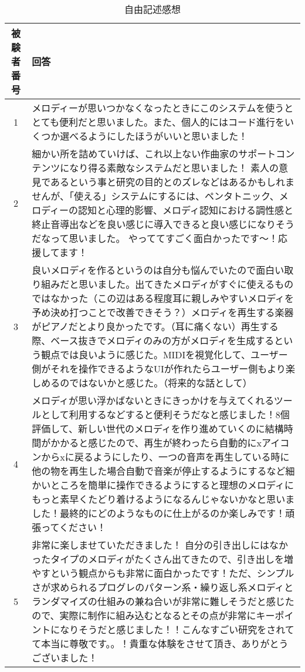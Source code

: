 \begin{table}[htbp]
  \begin{center}
    \caption{自由記述感想}
    \begin{tabular}{cp{30em}}
      \hline
      被験者番号 & 回答\rule[-3mm]{0mm}{8mm} \\ \hline \hline
      1 & メロディーが思いつかなくなったときにこのシステムを使うととても便利だと思いました。また、個人的にはコード進行をいくつか選べるようにしたほうがいいと思いました！ \\ \hline
      2 & 細かい所を詰めていけば、これ以上ない作曲家のサポートコンテンツになり得る素敵なシステムだと思いました！
      素人の意見であるという事と研究の目的とのズレなどはあるかもしれませんが、「使える」システムにするには、ペンタトニック、メロディーの認知と心理的影響、メロディ認知における調性感と終止音導出などを良い感じに導入できると良い感じになりそうだなって思いました。
      やっててすごく面白かったです～！応援してます！ \\ \hline
      3 & 良いメロディを作るというのは自分も悩んでいたので面白い取り組みだと思いました。出てきたメロディがすぐに使えるものではなかった（この辺はある程度耳に親しみやすいメロディを予め決め打つことで改善できそう？）メロディを再生する楽器がピアノだとより良かったです。（耳に痛くない）再生する際、ベース抜きでメロディのみの方がメロディを生成するという観点では良いように感じた。MIDIを視覚化して、ユーザー側がそれを操作できるようなUIが作れたらユーザー側もより楽しめるのではないかと感じた。（将来的な話として） \\ \hline
      4 & メロディが思い浮かばないときにきっかけを与えてくれるツールとして利用するなどすると便利そうだなと感じました！8個評価して、新しい世代のメロディを作り進めていくのに結構時間がかかると感じたので、再生が終わったら自動的にxアイコンからxに戻るようにしたり、一つの音声を再生している時に他の物を再生した場合自動で音楽が停止するようにするなど細かいところを簡単に操作できるようにすると理想のメロディにもっと素早くたどり着けるようになるんじゃないかなと思いました！最終的にどのようなものに仕上がるのか楽しみです！頑張ってください！ \\ \hline
      5 & 非常に楽しませていただきました！
      自分の引き出しにはなかったタイプのメロディがたくさん出てきたので、引き出しを増やすという観点からも非常に面白かったです！ただ、シンプルさが求められるプログレのパターン系・繰り返し系メロディとランダマイズの仕組みの兼ね合いが非常に難しそうだと感じたので、実際に制作に組み込むとなるとその点が非常にキーポイントになりそうだと感じました！！こんなすごい研究をされてて本当に尊敬です。。！貴重な体験をさせて頂き、ありがとうございました！ \\ \hline

\end{tabular}
\end{center}
\end{table}

